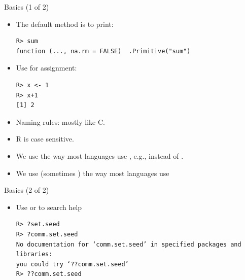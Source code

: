 \begin{frame}[fragile]
  \begin{block}{Basics (1 of 2)}\pause
  \begin{itemize}[<+-|alert@+>]
    \item The default method is to print:
    \vspace{-.4cm}
    \begin{lstlisting}[backgroundcolor=\color{white},basicstyle=\ttfamily\color{dkgray}\scriptsize,keywordstyle=\color{black}, 
  commentstyle=\color{orange},stringstyle=\color{mauve}]
R> sum
function (..., na.rm = FALSE)  .Primitive("sum")
    \end{lstlisting} 
    \item Use \code{<-} for assignment:    \vspace{-.4cm}
    \begin{lstlisting}[backgroundcolor=\color{white},basicstyle=\ttfamily\color{dkgray}\scriptsize,keywordstyle=\color{black}, 
  commentstyle=\color{orange},stringstyle=\color{mauve}]
R> x <- 1
R> x+1
[1] 2
    \end{lstlisting}
    \item Naming rules:  mostly like C.
    \item R is case sensitive.
    \item We use  the way most languages use \code{_}, e.g.,  instead of .
    \item We use \code{\$} (sometimes ) the way most languages use 
  \end{itemize}
\end{block}
\end{frame}

\begin{frame}[fragile]
  \begin{block}{Basics (2 of 2)}\pause
  \begin{itemize}[<+-|alert@+>]
    \item Use  or  to search help
    \vspace{-.4cm}
    \begin{lstlisting}[backgroundcolor=\color{white},basicstyle=\ttfamily\color{dkgray}\scriptsize,keywordstyle=\color{black}, 
  commentstyle=\color{orange},stringstyle=\color{mauve}]
R> ?set.seed
R> ?comm.set.seed
No documentation for ‘comm.set.seed’ in specified packages and libraries:
you could try ‘??comm.set.seed’
R> ??comm.set.seed
    \end{lstlisting}
  \end{itemize}
\end{block}
\end{frame}


